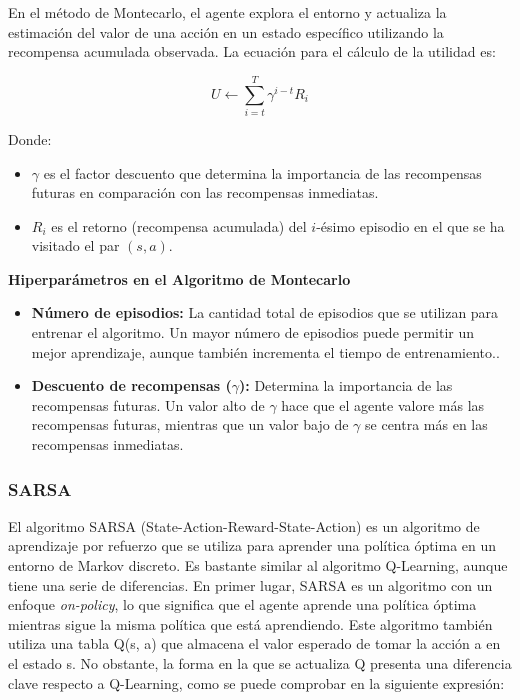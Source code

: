 \documentclass[conference,a4paper]{IEEEtran}
\begin{document}
En el método de Montecarlo, el agente explora el entorno y actualiza la estimación del valor de una acción en un estado específico utilizando la recompensa acumulada observada. La ecuación para el cálculo de la utilidad es:

\[
U \leftarrow \sum_{i=t}^{T} \gamma^{i-t} R_i
\]


Donde:
\begin{itemize}
    \item \(\gamma\) es el factor descuento que determina la importancia de las recompensas futuras en comparación con las recompensas inmediatas.
    \item \(R_i\) es el retorno (recompensa acumulada) del \(i\)-ésimo episodio en el que se ha visitado el par \((s, a)\).
\end{itemize}

\textbf{Hiperparámetros en el Algoritmo de Montecarlo}
\begin{itemize}
  \item \textbf{Número de episodios:} La cantidad total de episodios que se utilizan para entrenar el algoritmo. Un mayor número de episodios puede permitir un mejor aprendizaje, aunque también incrementa el tiempo de entrenamiento..
  \item \textbf{Descuento de recompensas (\(\gamma\)):}  Determina la importancia de las recompensas futuras. Un valor alto de \(\gamma\) hace que el agente valore más las recompensas futuras, mientras que un valor bajo de \(\gamma\) se centra más en las recompensas inmediatas.
\end{itemize}


\subsubsection{\textbf{SARSA}}
El algoritmo SARSA (State-Action-Reward-State-Action) es un algoritmo de aprendizaje por refuerzo que se utiliza para aprender una política óptima en un entorno de Markov discreto. Es bastante similar al algoritmo Q-Learning, 
aunque tiene una serie de diferencias. En primer lugar, SARSA es un algoritmo con un enfoque \textit{on-policy}, lo que significa 
que el agente aprende una política óptima mientras sigue la misma política que está aprendiendo. Este algoritmo también utiliza una tabla Q(s, a) que almacena el valor esperado de tomar la acción a en el estado s. No obstante, 
la forma en la que se actualiza Q presenta una diferencia clave respecto a Q-Learning, como se puede comprobar en la siguiente expresión:
\end{document}
